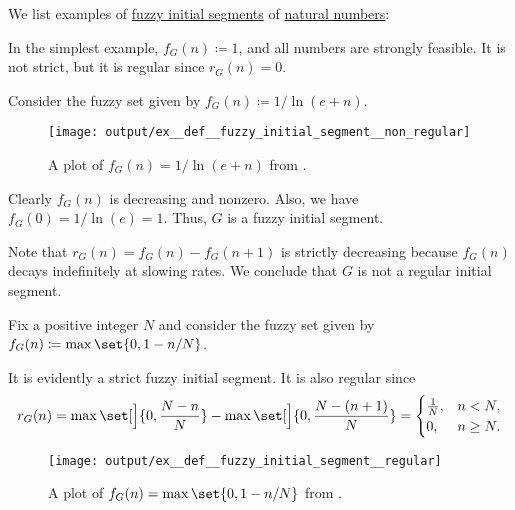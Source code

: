 \begin{example}\label{ex:def:fuzzy_initial_segment}
  We list examples of \hyperref[def:fuzzy_initial_segment]{fuzzy initial segments} of \hyperref[def:natural_numbers]{natural numbers}:
  \begin{thmenum}
     In the simplest example, \( f_G(n) \coloneqq 1 \), and all numbers are strongly feasible. It is not strict, but it is regular since \( r_G(n) = 0 \).

     Consider the fuzzy set given by \( f_G(n) \coloneqq 1 / \ln(e + n) \).

    \begin{figure}[!ht]
      \centering
      \texttt{[image: output/ex\_\_def\_\_fuzzy\_initial\_segment\_\_non\_regular]}
      \caption{A plot of \( f_G(n) = 1 / \ln(e + n) \) from .}\label{fig:ex:def:fuzzy_initial_segment/non_regular}
    \end{figure}

    Clearly \( f_G(n) \) is decreasing and nonzero. Also, we have \( f_G(0) = 1 / \ln(e) = 1 \). Thus, \( G \) is a fuzzy initial segment.

    Note that \( r_G(n) = f_G(n) - f_G(n + 1) \) is strictly decreasing because \( f_G(n) \) decays indefinitely at slowing rates. We conclude that \( G \) is not a regular initial segment.

     Fix a positive integer \( N \) and consider the fuzzy set given by \( f_G(n) \coloneqq \max\set{ 0, 1 - n / N } \).

    It is evidently a strict fuzzy initial segment. It is also regular since
    \begin{equation*}
      r_G(n)
      =
      \max\set[\Big]{ 0, \frac {N - n} N } - \max\set[\Big]{ 0, \frac {N - (n + 1)} N }
      =
      \begin{cases}
        \frac 1 N, &n < N, \\
        0,         &n \geq N.
      \end{cases}
    \end{equation*}

    \begin{figure}[!ht]
      \centering
      \texttt{[image: output/ex\_\_def\_\_fuzzy\_initial\_segment\_\_regular]}
      \caption{A plot of \( f_G(n) = \max\set{ 0, 1 - n / N } \) from .}\label{fig:ex:def:fuzzy_initial_segment/regular}
    \end{figure}
  \end{thmenum}
\end{example}
